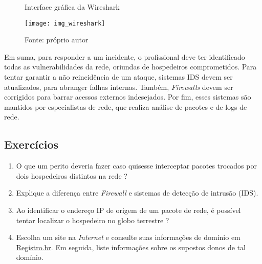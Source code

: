     \begin{figure}[H]
    	\centering
    	\caption{Interface gráfica da Wireshark}
    	\texttt{[image: img\_wireshark]}
    	\caption*{Fonte: próprio autor}
    	\label{wireshark_ex}
    \end{figure}

    \hspace{1cm}
    Em suma, para responder a um incidente, o profissional deve ter identificado todas as vulnerabilidades da rede, oriundas de hospedeiros comprometidos. Para tentar garantir a não reincidência de um ataque, sistemas IDS devem ser atualizados, para abranger falhas internas. Também, \textit{Firewalls} devem ser corrigidos para barrar acessos externos indesejados. Por fim, esses sistemas são mantidos por especialistas de rede, que realiza análise de pacotes e de logs de rede.

    \subsection{Exercícios}
    
    \begin{example} \label{cap4_exercicios}
        \begin{enumerate}
            \item O que um perito deveria fazer caso quisesse interceptar pacotes trocados por dois hospedeiros distintos na rede ?
            \item Explique a diferença entre \textit{Firewall} e sistemas de detecção de intrusão (IDS).
            \item Ao identificar o endereço IP de origem de um pacote de rede, é possível tentar localizar o hospedeiro no globo terrestre ? 
            \item Escolha um site na \textit{Internet} e consulte suas informações de domínio em \href{https://registro.br/tecnologia/ferramentas/whois/}{Registro.br}. Em seguida, 
            liste informações sobre os supostos donos de tal domínio.
        \end{enumerate}
    \end{example}

\newpage